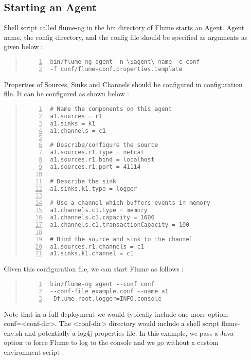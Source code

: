\documentclass[9pt,twocolumn,twoside]{styles/osajnl}
\begin{document}
\subsection{Starting an Agent}
Shell script called flume-ng in the bin directory of Flume starts an Agent. Agent name, the config directory, and the config file should be specified as arguments as given below \cite{user-manual}:

\begin{quote}
\begin{Verbatim}[numbers=left]
bin/flume-ng agent -n \$agent\_name -c conf 
-f conf/flume-conf.properties.template
\end{Verbatim}
\end{quote}

Properties of Sources, Sinks and Channels should be configured in configuration file. It can be configured as shown below \cite{user-manual}:
\begin{quote}
\begin{Verbatim}[numbers=left]
# Name the components on this agent
a1.sources = r1
a1.sinks = k1
a1.channels = c1

# Describe/configure the source
a1.sources.r1.type = netcat
a1.sources.r1.bind = localhost
a1.sources.r1.port = 41114

# Describe the sink
a1.sinks.k1.type = logger

# Use a channel which buffers events in memory
a1.channels.c1.type = memory
a1.channels.c1.capacity = 1600
a1.channels.c1.transactionCapacity = 100

# Bind the source and sink to the channel
a1.sources.r1.channels = c1
a1.sinks.k1.channel = c1\end{Verbatim}
\end{quote}

Given this configuration file, we can start Flume as follows \cite{user-manual}:
\begin{quote}
\begin{Verbatim}[numbers=left]
bin/flume-ng agent --conf conf 
--conf-file example.conf --name a1 
-Dflume.root.logger=INFO,console
\end{Verbatim}
\end{quote}
Note that in a full deployment we would typically include one more option: --conf=<conf-dir>. The <conf-dir> directory would include a shell script flume-env.sh and potentially a log4j properties file. In this example, we pass a Java option to force Flume to log to the console and we go without a custom environment script \cite{user-manual}.
\end{document}

